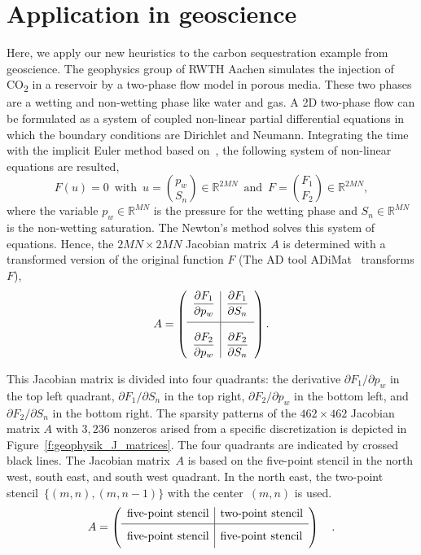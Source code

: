 \documentclass[12pt, twoside,a4paper,toc=bibliography]{scrbook}
\newcommand{\figref}[1]{Figure~\protect\ref{#1}}
\newcommand{\field}[1]{\mathbb{#1}}
\newcommand{\R}{\ensuremath{\field{R}}}
\begin{document}
\section{Application in geoscience}
\label{s.application}
Here, we apply our new heuristics to the carbon sequestration example from geoscience.
The geophysics group of RWTH Aachen simulates the injection of CO\textsubscript{2}
in a reservoir by a two-phase flow model in porous media. These two phases are a wetting
and non-wetting phase like water and gas. A 2D two-phase flow can be formulated as
a system of coupled non-linear partial differential equations in which the boundary conditions
are Dirichlet and Neumann. Integrating the time with the implicit Euler method
based on~\cite{Lulfesmann2012Fap}, the following system of non-linear equations are resulted,
$$F(u)=0 \, \text{ with } \, u = \binom{p_w}{S_n} \in \R^{2MN} \, \text{ and } \, F = \binom{F_1}{F_2} \in \R^{2MN},$$
where the variable $p_w \in \R^{MN}$ is the pressure for the wetting phase and $S_n \in \R^{MN}$ is the non-wetting saturation. The Newton's method solves this system of equations.
Hence, the $2MN \times 2MN$ Jacobian matrix $A$ is determined with a transformed version of the original function $F$ (The AD tool \mbox{ADiMat}~\cite{Bischof2005AML} transforms $F$),
$$
A =
\left({\begin{array}{l|l}
	\displaystyle \frac{\partial F_1}{\partial p_w} & \displaystyle \frac{\partial F_1}{\partial S_n} \\[1em]
	\hline
	\displaystyle \frac{\partial F_2}{\partial p_w} \rule[-7.5pt]{0pt}{30pt} & \displaystyle \frac{\partial F_2}{\partial S_n} \\
 \end{array}} \right).
$$

This Jacobian matrix is divided into four quadrants: the derivative $\partial F_1 / \partial p_w$ in the top left quadrant, $\partial F_1 / \partial S_n$ in the top right, $\partial F_2 / \partial p_w$ in the bottom left, and $\partial F_2 / \partial S_n$ in the bottom right. The sparsity patterns of the $462 \times 462$ Jacobian matrix $A$
with $3,236$ nonzeros arised from a specific discretization is depicted in \figref{f:geophysik_J_matrices}.
The four quadrants are indicated by crossed black lines. The Jacobian matrix~$A$ is based on the five-point stencil in the north west, south east, and south west quadrant. In the north east, the two-point stencil~$\{(m,n), (m,n-1)\}$ with the center~$(m,n)$ is used.
$$
A =
\left({\begin{array}{l|l}
	\text{five-point stencil} & \text{two-point stencil} \\[0.25em]
	\hline
	\text{five-point stencil} \rule[-7.5pt]{0pt}{21pt} & \text{five-point stencil} \\
 \end{array}} \right)
\quad.
$$
\end{document}
